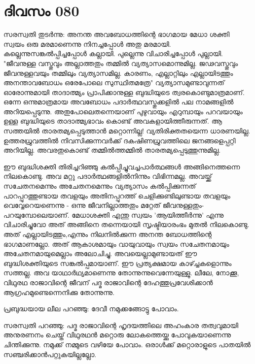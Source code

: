 \newpage
\section{ദിവസം 080}


സരസ്വതി തുടര്‍ന്നു: അനന്ത അവബോധത്തിന്റെ ഭാഗമായ മേധാ ശക്തി സ്വയം ഒരു മരമാണെന്നു നിനച്ചപ്പോള്‍ അതു മരമായി. കല്ലെന്നുസങ്കല്‍പ്പിച്ചപ്പോള്‍ കല്ലായി. പുല്ലെന്നു വിചാരിച്ചപ്പോള്‍ പുല്ലായി. "ജീവനുള്ള വസ്തുവും അല്ലാത്തതും തമ്മില്‍ വ്യത്യാസമൊന്നുമില്ല. ജഢവസ്തുവും ജീവനുള്ളവയും തമ്മിലും വ്യത്യാസമില്ല. കാരണം, എല്ലാറ്റിലും എല്ലായിടത്തും അനന്താവബോധം ഒരേപോലെ സുസ്ഥിതമത്രേ" വ്യത്യാസമുണ്ടാവുന്നത്‌ ഓരോന്നുമായി താദാത്മ്യം പ്രാപിക്കാനുള്ള ബുദ്ധിയുടെ ത്വരകൊണ്ടുമാത്രമാണ്‌. ഒന്നേ ഒന്നുമാത്രമായ അവബോധം പദാര്‍ത്ഥവസ്തുക്കളില്‍ പല നാമങ്ങളില്‍ അറിയപ്പെടുന്നു. അതുപോലെതന്നെയാണ്‌ പുഴുവായും എറുമ്പായും പറവയായും ഉള്ള ബുദ്ധിയുടെ താദാത്മ്യഭാവം കൊണ്ട്‌ അവകളായിത്തീരുന്നത്‌. ആ സത്തയില്‍ താരതമ്യപ്പെടുത്താന്‍ മറ്റൊന്നില്ല! വ്യതിരിക്തതയെന്ന ധാരണയില്ല. ഉത്തരധ്രുവത്തില്‍ നിവസിക്കുന്നവര്‍ക്ക്‌ ദകഷിണധ്രുവത്തിലെ ജനങ്ങളെപ്പറ്റി അറിയില്ല. അവരതുകൊണ്ട്‌ തമ്മില്‍ത്തമ്മില്‍ താരതമ്യപ്പെടുത്തുന്നുമില്ല. 

ഈ ബുദ്ധിശക്തി തിരിച്ചറിഞ്ഞു കല്‍പ്പിച്ചുവച്ചപാര്‍ത്ഥങ്ങള്‍ അങ്ങിനെത്തന്നെ നിലകൊണ്ടു. അവ മറ്റു പദാര്‍ത്ഥങ്ങളില്‍നിന്നും വിഭിന്നമല്ല. അവയ്ക്ക്‌ സചേതനമെന്നും അചേതനമെന്നും വ്യത്യാസം കല്‍പ്പിക്കുന്നത്‌ പാറപ്പുറത്തുണ്ടായ തവളയും അതിനപ്പുറത്ത്‌ ചെളിക്കുണ്ടിലുണ്ടായ തവളയും വെവ്വേറെയണെന്നു - ഒന്നു ജീവനില്ലാത്തതും മറ്റേത്‌ ജീവനുള്ളതും-പറയുമ്പോലെയാണ്‌. മേധാശക്തി എന്തു സ്വയം 'ആയിത്തീര്‍ന്നു' എന്നു വിചാരിച്ചുവോ അത്‌ അങ്ങിനെ തന്നെയായി സൃഷ്ടിയാരംഭം മുതല്‍ നിലകൊണ്ടു. അത്‌ എല്ലായിടത്തും,എന്നും നിലനില്‍ക്കുന്ന അനന്ത ബോധത്തിന്റെ ഭാഗമാണല്ലോ. അത്‌ ആകാശമായും വായുവായും സ്വയം സചേതനമായും അചേതനമായുമെല്ലാം അലോചിച്ചു. അവയെല്ലാമുണ്ടായത്‌ ഈ ബുദ്ധിശക്തിയുടെ സങ്കല്‍പ്പമായാണ്‌. ഈ പ്രത്യക്ഷമായ കാഴ്ച്ചകളൊന്നും സത്തല്ല. അവ യാഥാര്‍ഥ്യമാണെന്നു തോന്നുന്നുവെന്നേയുള്ളു. 
ലീലേ, നോക്കൂ, വിഥുരഥ രാജാവിന്റെ ജീവന്‌ പദ്മ രാജാവിന്റെ ദേഹത്തുപ്രവേശിക്കാന്‍ ആഗ്രഹമുണ്ടെന്നെനിക്കു തോന്നുന്നു.

പ്രബുദ്ധയായ ലീല പറഞ്ഞു: ദേവീ നമുക്കങ്ങോട്ടു പോവാം.

സരസ്വതി പറഞ്ഞു: പദ്മ രാജാവിന്റെ ഹൃദയത്തിലെ അഹംകാര തത്വവുമായി അനുരണനം ചെയ്ത്‌ വിഥുരഥന്‍ മറ്റൊരു ലോകത്തെയ്ക്കു പോവുകയാണെന്നു ചിന്തിക്കുന്നു. നമുക്ക്‌ നമ്മുടെ വഴിയേ പോവാം. ഒരാള്‍ക്ക്‌ മറ്റൊരാളുടെ പാതയില്‍ സഞ്ചരിക്കാന്‍പറ്റുകയില്ലല്ലോ.  
